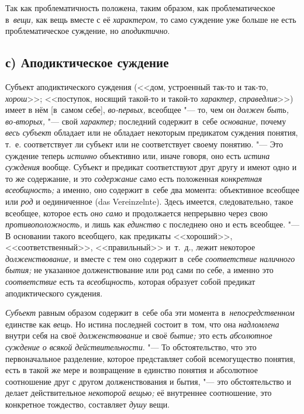 \label{bkm:bm66b}Так как проблематичность положена, таким образом, как
проблематическое в~{\em вещи,} как вещь вместе с её {\em характером,} то само
суждение уже больше не есть проблематическое суждение, но {\em аподиктично}.

\subsection[с) Аподиктическое суждение]{с) Аподиктическое суждение}

Субъект аподиктического суждения (<<дом, устроенный так-то и так-то,
{\em хорош}>>; <<поступок, носящий такой-то и такой-то {\em характер,}
{\em справедлив}>>) имеет в нём [в~самом себе], {\em во-первых,}
всеобщее "--- то, чем он {\em должен быть, во-вторых,} "--- свой
{\em характер;} последний содержит в~себе {\em основание,} почему
{\em весь субъект} обладает или не обладает некоторым предикатом суждения
понятия, т.~е. соответствует ли субъект или не соответствует своему
понятию. "--- Это суждение теперь {\em истинно} объективно или, иначе говоря,
оно есть {\em истина суждения} вообще. Субъект и предикат соответствуют друг
другу и имеют одно и то же содержание, и это {\em содержание} само есть
положенная {\em конкретная всеобщность;} а именно, оно содержит в~себе два
момента: объективное всеобщее или {\em род} и
оединиченное (das Verein\-zelnte). Здесь имеется, следовательно, такое
всеобщее, которое есть {\em оно само} и продолжается непрерывно через свою
{\em противоположность,} и лишь как {\em единство} с последнею оно и есть
всеобщее. "--- В основании такого всеобщего, как предикаты <<хороший>>,
<<соответственный>>, <<правильный>> и~т.~д., лежит некоторое
{\em долженствование,} и вместе с тем оно содержит в~себе {\em соответствие
наличного бытия;} не указанное долженствование или род сами по себе, а именно
это {\em соответствие} есть та {\em всеобщность,} которая образует собой
предикат аподиктического суждения.

{\em Субъект} равным образом содержит в~себе оба эти момента
в~{\em непосредственном} единстве как {\em вещь}. Но истина последней состоит
в~том, что она {\em надломлена} внутри себя на своё {\em долженствование}
и своё {\em бытие;} это есть {\em абсолютное суждение о всякой
действительности}. "--- То обстоятельство,
что это первоначальное разделение, которое представляет собой всемогущество
понятия, есть в такой же мере и возвращение в единство понятия и абсолютное
соотношение друг с другом долженствования и бытия, "--- это обстоятельство
и делает действительное {\em некоторой вещью;} её внутреннее соотношение,
это конкретное тождество, составляет {\em душу} вещи.

